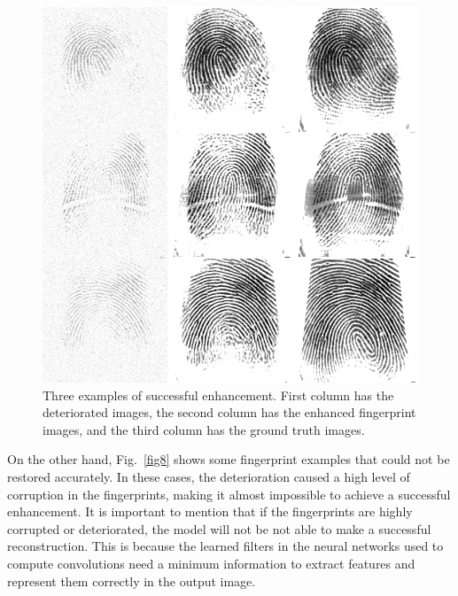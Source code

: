 \documentclass[a4paper,fleqn]{cas-dc}
\begin{document}
\begin{figure}[!ht]
\centerline{\includegraphics[scale=0.28]{figs/recons_2.png}}
\caption{Three examples of successful enhancement. First column has the deteriorated images, the second column has the enhanced fingerprint images, and the third column has the ground truth images.}
\label{fig7}
\end{figure}
On the other hand, Fig.~\ref{fig8} shows some fingerprint examples that could not be restored accurately. In these cases, the deterioration caused a high level of corruption in the fingerprints, making it almost impossible to achieve a successful enhancement. It is important to mention that if the fingerprints are highly corrupted or deteriorated, the model will not be not able to make a successful reconstruction. This is because the learned filters in the neural networks used to compute convolutions need a minimum information to extract features and represent them correctly in the output image.
\end{document}
